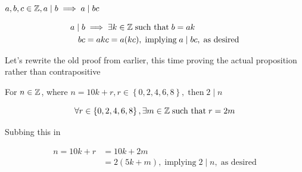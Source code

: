\documentclass[../../Main.tex]{subfiles}
\begin{document}
\begin{proposition}
    $a, b, c \in \mathbb{Z}, a \mid b \implies a \mid bc$

    \begin{poof}
        \begin{align*}
            a \mid b &\implies \exists k \in \mathbb{Z} \; \text{such that} \; b = ak \\
            bc &= akc = a(kc), \; \text{implying} \; a \mid bc, \; \text{as desired}
        \end{align*}
    \end{poof}
\end{proposition}

Let's rewrite the old proof from earlier, this time proving the actual proposition rather than contrapositive

\begin{proposition}
    For $n \in \mathbb{Z}$, where $n = 10k + r, r \in \left\{0, 2, 4, 6, 8\right\}, \; \text{then} \; 2 \mid n$

    \begin{poof}
        
        $$\forall r \in \left\{0, 2, 4, 6, 8\right\}, \exists m \in \mathbb{Z} \; \text{such that} \; r = 2m $$

        Subbing this in

        \begin{align*}
            n = 10k + r &= 10 k + 2m \\
            &= 2(5k + m), \; \text{implying} \; 2 \mid n, \; \text{as desired} \\
        \end{align*}
    \end{poof}
\end{proposition}
\end{document}
